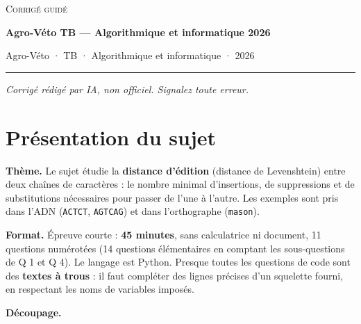 \documentclass[11pt,a4paper]{article}
\begin{document}
\thispagestyle{plain}
\begin{center}
  {\small\scshape Corrigé guidé}\par\smallskip
  {\LARGE\bfseries Agro-Véto TB — Algorithmique et informatique 2026\par}\medskip
  {\large Agro-Véto · TB · Algorithmique et informatique · 2026\par}
\end{center}
\vspace{2pt}\hrule\vspace{8pt}

\emph{Corrigé rédigé par IA, non officiel. Signalez toute erreur.}

\hypertarget{pruxe9sentation-du-sujet}{%
\section{Présentation du sujet}\label{pruxe9sentation-du-sujet}}

\textbf{Thème.} Le sujet étudie la \textbf{distance d'édition} (distance de Levenshtein) entre deux chaînes de caractères : le nombre minimal d'insertions, de suppressions et de substitutions nécessaires pour passer de l'une à l'autre. Les exemples sont pris dans l'ADN (\texttt{\textquotesingle{}ACTCT\textquotesingle{}}, \texttt{\textquotesingle{}AGTCAG\textquotesingle{}}) et dans l'orthographe (\texttt{\textquotesingle{}mason\textquotesingle{}}).

\textbf{Format.} Épreuve courte : \textbf{45 minutes}, sans calculatrice ni document, 11 questions numérotées (14 questions élémentaires en comptant les sous-questions de Q 1 et Q 4). Le langage est Python. Presque toutes les questions de code sont des \textbf{textes à trous} : il faut compléter des lignes précises d'un squelette fourni, en respectant les noms de variables imposés.

\textbf{Découpage.}
\end{document}
